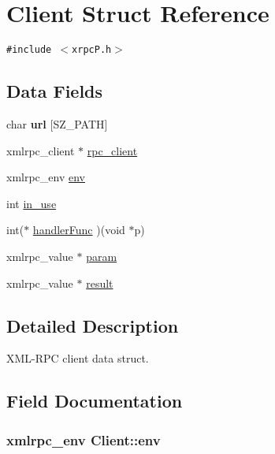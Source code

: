 \hypertarget{structClient}{
\section{Client Struct Reference}
\label{structClient}
}
{\tt \#include $<$xrpcP.h$>$}

\subsection*{Data Fields}
\begin{CompactItemize}
\item 
\hypertarget{structClient_7cdcbddf76da1adb9f73e8bdbb1684aa}{
char \textbf{url} \mbox{[}SZ\_\-PATH\mbox{]}}
\label{structClient_7cdcbddf76da1adb9f73e8bdbb1684aa}

\item 
xmlrpc\_\-client $\ast$ \hyperlink{structClient_d4a6025c88f880e4bf4060f2018c5695}{rpc\_\-client}
\item 
xmlrpc\_\-env \hyperlink{structClient_396227b4ec4cce6d7d62d252030a7541}{env}
\item 
int \hyperlink{structClient_5869e4fdb3a1a88b14faa4f2dda27c66}{in\_\-use}
\item 
int($\ast$ \hyperlink{structClient_883a4aa7cd951660a7835ca5242bdfc7}{handlerFunc} )(void $\ast$p)
\item 
xmlrpc\_\-value $\ast$ \hyperlink{structClient_e4d1bc206122b68b2def984a105ed189}{param}
\item 
xmlrpc\_\-value $\ast$ \hyperlink{structClient_5985ff24d5b811f1c96b8a083d6e0e31}{result}
\end{CompactItemize}


\subsection{Detailed Description}
XML-RPC client data struct. 

\subsection{Field Documentation}
\hypertarget{structClient_396227b4ec4cce6d7d62d252030a7541}{
\subsubsection[{env}]{\setlength{\rightskip}{0pt plus 5cm}xmlrpc\_\-env {\bf Client::env}}}
\label{structClient_396227b4ec4cce6d7d62d252030a7541}


